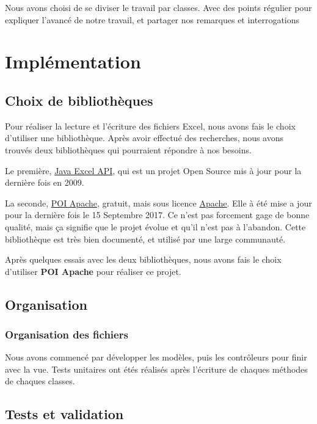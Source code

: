 \documentclass{polytech/polytech}
\begin{document}
	Nous avons choisi de se diviser le travail par classes.
	Avec des points régulier pour expliquer l'avancé de notre travail, et partager nos remarques et
	interrogations

	\chapter{Implémentation}

	\section{Choix de bibliothèques}


	Pour réaliser la lecture et l'écriture des fichiers Excel, nous avons fais le choix d'utiliser une bibliothèque.
	Après avoir effectué des recherches, nous avons trouvés deux bibliothèques qui pourraient répondre à nos besoins.

	Le première, \href{http://jexcelapi.sourceforge.net/}{Java Excel API}, qui est un projet Open Source mis à jour pour la dernière fois en 2009.

	La seconde, \href{http://poi.apache.org}{POI Apache}, gratuit, mais sous licence \href{https://www.apache.org/licenses/}{Apache}.
	Elle à été mise a jour pour la dernière fois le 15 Septembre 2017.
	Ce n'est pas forcement gage de bonne qualité, mais ça signifie que le projet évolue et qu'il n'est pas à l'abandon.
	Cette bibliothèque est très bien documenté, et utilisé par une large communauté.

	Après quelques essais avec les deux bibliothèques, nous avons fais le choix d'utiliser \textbf{POI Apache} pour réaliser ce projet.

	\section{Organisation}

	\subsection{Organisation des fichiers}

	Nous avons commencé par développer les modèles, puis les contrôleurs pour finir avec la vue.
	Tests unitaires ont étés réalisés après l'écriture de chaques méthodes de chaques classes.

	\section{Tests et validation}
\end{document}
